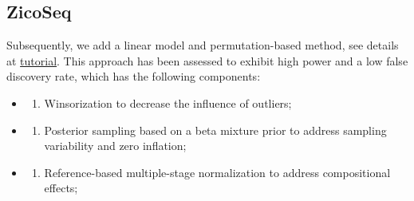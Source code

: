 \documentclass[
]{book}
\providecommand{\tightlist}{%
  \setlength{\itemsep}{0pt}\setlength{\parskip}{0pt}}
\begin{document}
\hypertarget{zicoseq}{%
\subsection{ZicoSeq}\label{zicoseq}}

Subsequently, we add a linear model and permutation-based method, see details at \href{https://cran.r-project.org/web/packages/GUniFrac/vignettes/ZicoSeq.html}{tutorial}. This approach has been assessed to exhibit high power and a low false discovery rate, which has the following components:

\begin{itemize}
\item
  \begin{enumerate}
  \def\labelenumi{\arabic{enumi})}
  \tightlist
  \item
    Winsorization to decrease the influence of outliers;
  \end{enumerate}
\item
  \begin{enumerate}
  \def\labelenumi{\arabic{enumi})}
  \setcounter{enumi}{1}
  \tightlist
  \item
    Posterior sampling based on a beta mixture prior to address sampling variability and zero inflation;
  \end{enumerate}
\item
  \begin{enumerate}
  \def\labelenumi{\arabic{enumi})}
  \setcounter{enumi}{2}
  \tightlist
  \item
    Reference-based multiple-stage normalization to address compositional effects;
  \end{enumerate}
\end{itemize}
\end{document}
